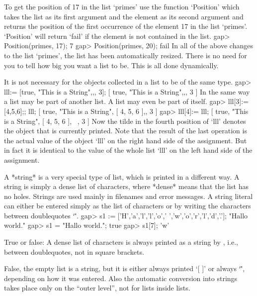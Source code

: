 To get the position    of 17 in  the   list  `primes' use   the  function
`Position' which takes the list as its  first argument and the element as
its second argument  and returns the position of  the first occurrence of
the element 17 in the list `primes'. `Position' will return `fail' if the
element is not contained in the list.
\beginexample
    gap> Position(primes, 17);
    7
    gap> Position(primes, 20);
    fail
\endexample
In  all  of the  above changes to  the  list `primes',  the list has been
automatically resized.  There  is no need  for you to tell {\GAP} how big
you want a list to be.  This is all done dynamically.

It is not necessary for the objects collected in a list to be of the same
type.
\beginexample
    gap> lll:= [true, "This is a String",,, 3];
    [ true, "This is a String",,, 3 ] 
\endexample
In the same way a list may be part of another  list.  A list  may even be
part of itself.
\beginexample
    gap> lll[3]:= [4,5,6];; lll;
    [ true, "This is a String", [ 4, 5, 6 ],, 3 ]
    gap> lll[4]:= lll;
    [ true, "This is a String", [ 4, 5, 6 ], ~, 3 ] 
\endexample
Now the tilde in the fourth position of `lll'  denotes the object that is
currently  printed. Note that  the result  of the  last operation is  the
actual value  of  the  object  `lll'   on  the  right  hand side  of  the
assignment. But in  fact it is  identical to the value  of the whole list
`lll' on the left hand side of the assignment.

%
A *string*  is a very  special   type of  list,  which  is  printed in  a
different way.  A string  is simply  a  dense list of   characters, where
*dense* means  that the list  has no holes.   Strings are used  mainly in
filenames and   error messages. A  string  literal can either  be entered
simply as the  list of characters  or  by writing the characters  between
doublequotes `\"'.
\beginexample
    gap> s1 := ['H','a','l','l','o',' ','w','o','r','l','d','.'];
    "Hallo world."
    gap> s1 = "Hallo world.";
    true
    gap> s1[7];
    'w' 
\endexample

\exercise True or false: A dense list of  characters is always printed as
a string by {\GAP}, i.e., between doublequotes, not in square brackets.

\answer False, the  empty list  is a string,   but  it is either   always
printed `[ ]' or always `\"\"', depending on how it was entered. Also the
automatic conversion   into strings  takes   place  only on  the  ``outer
level'', not for lists inside lists.


